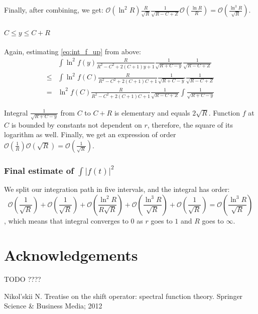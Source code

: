 \documentclass{gCOV2e}
\theoremstyle{plain}%
\theoremstyle{definition}
\theoremstyle{remark}
\begin{document}
Finally, after combining, we get: $\mathcal{O} (\ln^2 R) \frac{R}{\sqrt{R}} \frac{1}{\sqrt{R - C + Z}} \mathcal{O}\left( \frac{\ln R}{R} \right)  = \mathcal{O}\left( \frac{\ln^3 R}{\sqrt{R}} \right)$.

\paragraph{$C \le y \le C + R$}

Again, estimating \ref{eq:int_f_up} from above:
\begin{align*}
       & \int \ln^2 f(y) \frac{R}{R^2 - C^2 + 2 (C + 1) y + 1} \frac{1}{\sqrt{R + C - y}} \frac{1}{\sqrt{R - C + Z}}
\\ \le & \int \ln^2 f(C) \frac{R}{R^2 - C^2 + 2 (C + 1) C + 1} \frac{1}{\sqrt{R + C - y}} \frac{1}{\sqrt{R - C + Z}}
\\ =   & \ln^2 f(C) \frac{R}{R^2 - C^2 + 2 (C + 1) C + 1} \frac{1}{\sqrt{R - C + Z}} \int \frac{1}{\sqrt{R + C - y}}
\end{align*}

Integral $\frac{1}{\sqrt{R + C - y}}$ from $C$ to $C + R$ is elementary and equals $2 \sqrt{R}$. Function $f$ at $C$ is bounded by constants not dependent on $r$, therefore, the square of its logarithm as well. Finally, we get an expression of order $\mathcal{O} \left( \frac{1}{R} \right) \mathcal{O}( \sqrt R ) = \mathcal{O} \left( \frac{1}{\sqrt{R}} \right)$.

\subsubsection{Final estimate of $\int \left|f(t)\right|^2$}
We split our integration path in five intervals, and the integral has order:
\[
\mathcal{O} \left( \frac{1}{\sqrt{R}} \right) + \mathcal{O} \left( \frac{1}{\sqrt{R}} \right) +\mathcal{O}\left(\frac{\ln^2 R}{R \sqrt{R}}\right) + \mathcal{O}\left( \frac{\ln^3 R}{\sqrt{R}} \right) + \mathcal{O} \left( \frac{1}{\sqrt{R}} \right) = \mathcal{O}\left( \frac{\ln^3 R}{\sqrt{R}} \right)
\]
, which means that integral converges to $0$ as $r$ goes to $1$ and $R$ goes to $\infty$.

\section*{Acknowledgements}
TODO ????

\begin{thebibliography}{99}

Nikol'skii N. Treatise on the shift operator: spectral function theory. Springer Science \& Business Media; 2012

\end{thebibliography}
\end{document}
